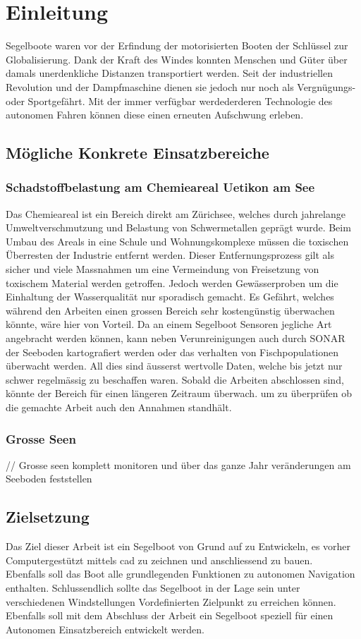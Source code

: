 
\chapter{Einleitung }
\label{chap:einleitung}
Segelboote waren vor der Erfindung der motorisierten Booten der Schlüssel zur Globalisierung. Dank der Kraft des Windes konnten Menschen und Güter über damals unerdenkliche Distanzen transportiert werden. Seit der industriellen Revolution und der Dampfmaschine dienen sie jedoch nur noch als Vergnügungs- oder Sportgefährt. Mit der immer verfügbar werdederderen Technologie des autonomen Fahren können diese einen erneuten Aufschwung erleben. 

\section{Mögliche Konkrete Einsatzbereiche}
\subsection{Schadstoffbelastung am Chemieareal Uetikon am See}
Das Chemieareal ist ein Bereich direkt am Zürichsee, welches durch jahrelange Umweltverschmutzung und Belastung von Schwermetallen geprägt wurde. Beim Umbau des Areals in eine Schule und Wohnungskomplexe müssen die toxischen Überresten der Industrie entfernt werden. Dieser Entfernungsprozess gilt als sicher und viele Massnahmen um eine Vermeindung von Freisetzung von toxischem Material werden getroffen. Jedoch werden Gewässerproben um die Einhaltung der Wasserqualität nur sporadisch gemacht. Es Gefährt, welches während den Arbeiten einen grossen Bereich sehr kostengünstig überwachen könnte, wäre hier von Vorteil. Da an einem Segelboot Sensoren jegliche Art angebracht werden können, kann neben Verunreinigungen auch durch SONAR der Seeboden kartografiert werden oder das verhalten von Fischpopulationen überwacht werden. All dies sind äusserst wertvolle Daten, welche bis jetzt nur schwer regelmässig zu beschaffen waren. Sobald die Arbeiten abschlossen sind, könnte der Bereich für einen längeren Zeitraum überwach. um zu überprüfen ob die gemachte Arbeit auch den Annahmen standhält.

\subsection{Grosse Seen}
// Grosse seen komplett monitoren und über das ganze Jahr veränderungen am Seeboden feststellen

\section{Zielsetzung}
Das Ziel dieser Arbeit ist ein Segelboot von Grund auf zu Entwickeln, es vorher Computergestützt mittels \ac{cad} zu zeichnen und anschliessend zu bauen. \\
Ebenfalls soll das Boot alle grundlegenden Funktionen zu autonomen Navigation enthalten. Schlussendlich sollte das Segelboot in der Lage sein unter verschiedenen Windstellungen Vordefinierten Zielpunkt zu erreichen können. Ebenfalls soll mit dem Abschluss der Arbeit ein Segelboot speziell für einen Autonomen Einsatzbereich entwickelt werden. 

